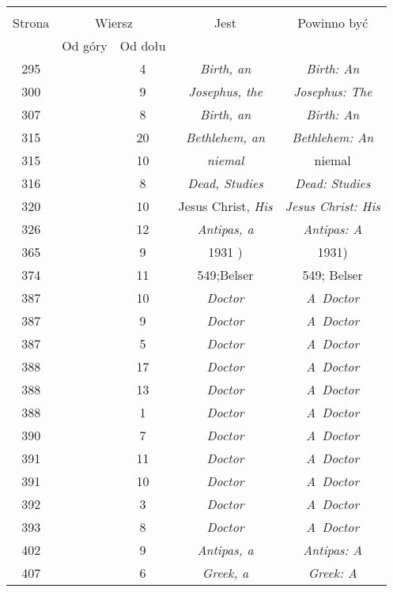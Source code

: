 \documentclass[a4paper,11pt]{article}
\begin{document}
\begin{center}
  \begin{tabular}{|c|c|c|c|c|}
    \hline
    & \multicolumn{2}{c|}{} & & \\
    Strona & \multicolumn{2}{c|}{Wiersz} & Jest
                              & Powinno być \\ \cline{2-3}
    & Od góry & Od dołu & & \\
    \hline
    295 & &  4 & \textit{Birth, an} & \textit{Birth: An} \\
    300 & &  9 & \textit{Josephus, the} & \textit{Josephus: The} \\
    307 & &  8 & \textit{Birth, an} & \textit{Birth: An} \\
    315 & & 20 & \textit{Bethlehem, an} & \textit{Bethlehem: An} \\
    315 & & 10 & \textit{niemal} & niemal \\
    316 & &  8 & \textit{Dead, Studies} & \textit{Dead: Studies} \\
    320 & & 10 & Jesus Christ, \textit{His} & \textit{Jesus Christ: His} \\
    326 & & 12 & \textit{Antipas, a} & \textit{Antipas: A} \\
    365 & &  9 & 1931 ) & 1931) \\
    374 & & 11 & 549;Belser & 549; Belser \\
    387 & & 10 & \textit{Doctor} & \textit{A~Doctor} \\
    387 & &  9 & \textit{Doctor} & \textit{A~Doctor} \\
    387 & &  5 & \textit{Doctor} & \textit{A~Doctor} \\
    388 & & 17 & \textit{Doctor} & \textit{A~Doctor} \\
    388 & & 13 & \textit{Doctor} & \textit{A~Doctor} \\
    388 & &  1 & \textit{Doctor} & \textit{A~Doctor} \\
    390 & &  7 & \textit{Doctor} & \textit{A~Doctor} \\
    391 & & 11 & \textit{Doctor} & \textit{A~Doctor} \\
    391 & & 10 & \textit{Doctor} & \textit{A~Doctor} \\
    392 & &  3 & \textit{Doctor} & \textit{A~Doctor} \\
    393 & &  8 & \textit{Doctor} & \textit{A~Doctor} \\
    402 & &  9 & \textit{Antipas, a} & \textit{Antipas: A }\\
    407 & &  6 & \textit{Greek, a} & \textit{Greek: A} \\

\end{tabular}
\end{center}
\end{document}
